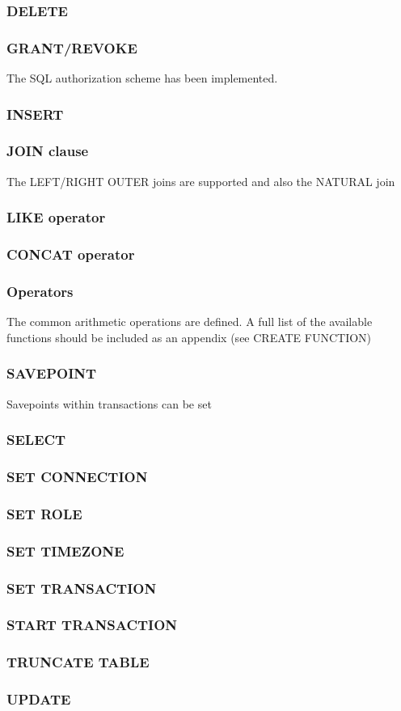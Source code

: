 \documentclass[10pt,twocolumn,fleqn]{article}
\begin{document}
\subsubsection*{DELETE}
\subsubsection*{GRANT/REVOKE}
The SQL authorization scheme has been implemented.

\subsubsection*{INSERT}
\subsubsection*{JOIN clause}
The LEFT/RIGHT OUTER joins are supported and also the NATURAL join

\subsubsection*{LIKE operator}
\subsubsection*{CONCAT operator}
\subsubsection*{Operators}
The common arithmetic operations are defined. A full list of the
available functions should be included as an appendix (see CREATE FUNCTION)

\subsubsection*{SAVEPOINT}
Savepoints within transactions can be set

\subsubsection*{SELECT }
\subsubsection*{SET CONNECTION}
\subsubsection*{SET ROLE }
\subsubsection*{SET TIMEZONE }
\subsubsection*{SET TRANSACTION}
\subsubsection*{START TRANSACTION}
\subsubsection*{TRUNCATE TABLE}
\subsubsection*{UPDATE}
\end{document}
